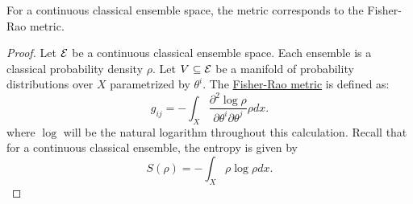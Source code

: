\begin{mathSection}
\begin{prop}
	For a continuous classical ensemble space, the metric corresponds to the Fisher-Rao metric.
\end{prop}

\begin{proof}
	Let $\mathcal{E}$ be a continuous classical ensemble space. Each ensemble is a classical probability density $\rho$. Let $V \subseteq \mathcal{E}$ be a manifold of probability distributions over $X$ parametrized by $\theta^i$. The \href{https://en.wikipedia.org/wiki/Fisher_information_metric}{Fisher-Rao metric} is defined as:
	\begin{equation}
		g_{ij} =- \int_X \frac{\partial^2 \log \rho}{\partial \theta^i \partial \theta^j} \rho dx.
	\end{equation}
	where $\log$ will be the natural logarithm throughout this calculation. Recall that for a continuous classical ensemble, the entropy is given by
	\begin{equation}
		S(\rho) =- \int_X \rho \log \rho dx.
	\end{equation}
	

\end{proof}
\end{mathSection}

